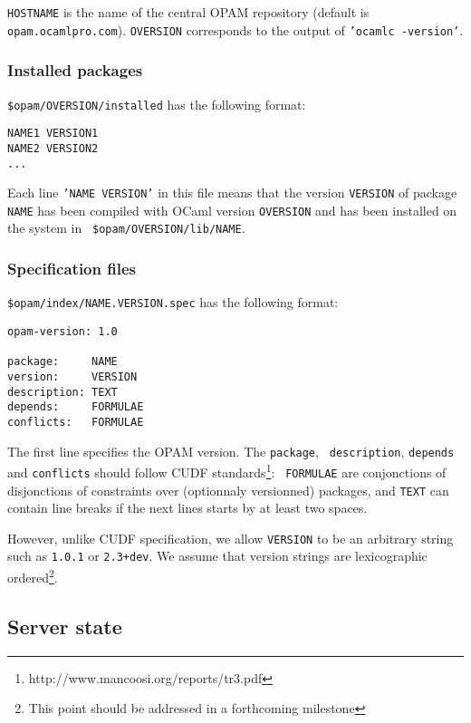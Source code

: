\documentclass[a4paper,11pt]{article}
\begin{document}
{\tt HOSTNAME} is the name of the central OPAM repository (default is
{\tt opam.ocamlpro.com}). {\tt OVERSION} corresponds to the output of
{\tt 'ocamlc -version'}.

\subsubsection{Installed packages}
\label{installed}

{\tt \$opam/OVERSION/installed} has the following format:

\begin{verbatim}
NAME1 VERSION1
NAME2 VERSION2
...
\end{verbatim}

Each line {\tt 'NAME VERSION'} in this file means that the version
{\tt VERSION} of package {\tt NAME} has been compiled with OCaml
version {\tt OVERSION} and has been installed on the system in {\tt
  \$opam/OVERSION/lib/NAME}.

\subsubsection{Specification files}
\label{spec}

{\tt \$opam/index/NAME.VERSION.spec} has the following format:

\begin{verbatim}
opam-version: 1.0

package:     NAME
version:     VERSION
description: TEXT
depends:     FORMULAE
conflicts:   FORMULAE
\end{verbatim}

The first line specifies the OPAM version. The {\tt package}, {\tt
  description}, {\tt depends} and {\tt conflicts} should follow CUDF
standards\footnote{http://www.mancoosi.org/reports/tr3.pdf}: {\tt
  FORMULAE} are conjonctions of disjonctions of constraints over
(optionnaly versionned) packages, and {\tt TEXT} can contain line
breaks if the next lines starts by at least two spaces.

However, unlike CUDF specification, we allow {\tt VERSION} to be an
arbitrary string such as {\tt 1.0.1} or {\tt 2.3+dev}. We assume that
version strings are lexicographic ordered\footnote{This point should
  be addressed in a forthcoming milestone}.

\subsection{Server state}
\end{document}
